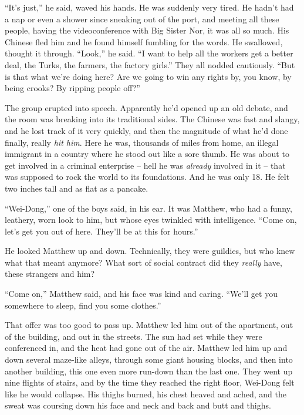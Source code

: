 ``It's just,'' he said, waved his hands. He was suddenly very tired.
He hadn't had a nap or even a shower since sneaking out of the
port, and meeting all these people, having the videoconference with
Big Sister Nor, it was all so much. His Chinese fled him and he
found himself fumbling for the words. He swallowed, thought it
through. ``Look,'' he said. ``I want to help all the workers get a
better deal, the Turks, the farmers, the factory girls.'' They all
nodded cautiously. ``But is that what we're doing here? Are we going
to win any rights by, you know, by being crooks? By ripping people
off?''

The group erupted into speech. Apparently he'd opened up an old
debate, and the room was breaking into its traditional sides. The
Chinese was fast and slangy, and he lost track of it very quickly,
and then the magnitude of what he'd done finally, really
\emph{hit him}. Here he was, thousands of miles from home, an
illegal immigrant in a country where he stood out like a sore
thumb. He was about to get involved in a criminal enterprise --
hell he was \emph{already} involved in it -- that was supposed to
rock the world to its foundations. And he was only 18. He felt two
inches tall and as flat as a pancake.

``Wei-Dong,'' one of the boys said, in his ear. It was Matthew, who
had a funny, leathery, worn look to him, but whose eyes twinkled
with intelligence. ``Come on, let's get you out of here. They'll be
at this for hours.''

He looked Matthew up and down. Technically, they were guildies, but
who knew what that meant anymore? What sort of social contract did
they \emph{really} have, these strangers and him?

``Come on,'' Matthew said, and his face was kind and caring. ``We'll
get you somewhere to sleep, find you some clothes.''

That offer was too good to pass up. Matthew led him out of the
apartment, out of the building, and out in the streets. The sun had
set while they were conferenced in, and the heat had gone out of
the air. Matthew led him up and down several maze-like alleys,
through some giant housing blocks, and then into another building,
this one even more run-down than the last one. They went up nine
flights of stairs, and by the time they reached the right floor,
Wei-Dong felt like he would collapse. His thighs burned, his chest
heaved and ached, and the sweat was coursing down his face and neck
and back and butt and thighs.

